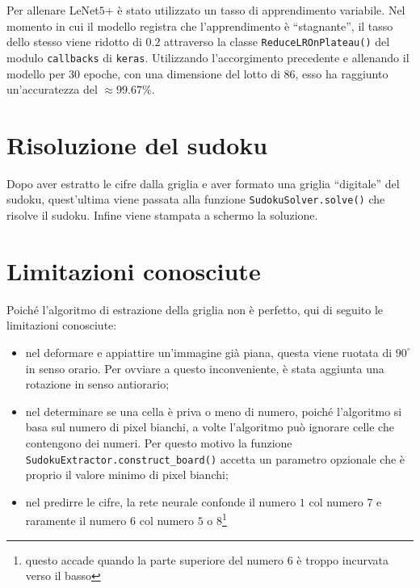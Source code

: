 \documentclass[a4paper, 10pt]{article}
\newcommand{\lenet}{LeNet\(5\)+}
\begin{document}
Per allenare \lenet{} è stato utilizzato un tasso di apprendimento variabile.
Nel momento in cui il modello registra che l'apprendimento è ``stagnante'', il
tasso dello stesso viene ridotto di \(0.2\) attraverso la classe
\texttt{ReduceLROnPlateau()} del modulo \texttt{callbacks}
di \texttt{keras}.
Utilizzando l'accorgimento precedente e allenando il modello per \(30\) epoche,
con una dimensione del lotto di \(86\), esso ha raggiunto un'accuratezza del
\(\approx 99.67\%\).

\section{Risoluzione del sudoku}

Dopo aver estratto le cifre dalla griglia e aver formato una griglia
``digitale'' del sudoku, quest'ultima viene passata alla funzione
\texttt{SudokuSolver.solve()} che risolve il sudoku. Infine viene
stampata a schermo la soluzione.

\section{Limitazioni conosciute}

Poiché l'algoritmo di estrazione della griglia non è perfetto, qui di seguito le
limitazioni conosciute:

\begin{itemize}
    \item nel deformare e appiattire un'immagine già piana, questa viene ruotata di \(90^\circ\) in senso orario. Per ovviare a questo inconveniente, è stata aggiunta una rotazione in senso antiorario;
    \item nel determinare se una cella è priva o meno di numero, poiché l'algoritmo si basa sul numero di pixel bianchi, a volte l'algoritmo può ignorare celle che contengono dei numeri. Per questo motivo la funzione \texttt{SudokuExtractor.construct_board()} accetta un parametro opzionale che è proprio il valore minimo di pixel bianchi;
    \item nel predirre le cifre, la rete neurale confonde il numero \(1\) col numero \(7\) e raramente il numero \(6\) col numero \(5\) o \(8\)\footnote{questo accade quando la parte superiore del numero \(6\) è troppo incurvata verso il basso}
\end{itemize}


\bigskip
\printbibliography
\end{document}
